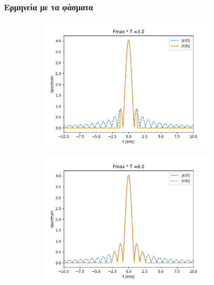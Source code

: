 \documentclass[9pt]{beamer}
\begin{document}
	\begin{frame}
		\frametitle{Ερμηνεία με τα φάσματα}
		\begin{figure}
			\begin{subfigure}{0.49\linewidth}
				\includegraphics[width=\linewidth]{BT3s}
			\end{subfigure}
			\begin{subfigure}{0.49\linewidth}
				\includegraphics[width=\linewidth]{BT6s}	
			\end{subfigure}		
		\end{figure}
	\end{frame}
\end{document}
